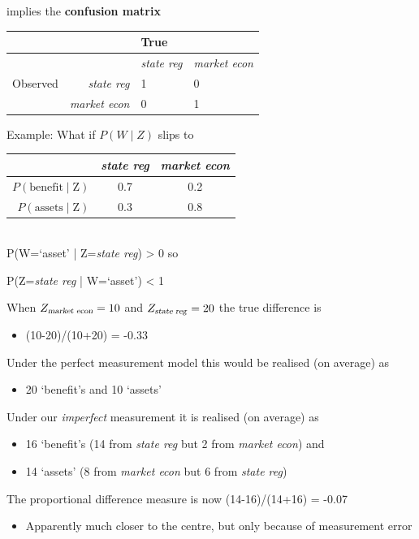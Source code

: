 \documentclass[11pt,compress,professionalfonts]{beamer}
\newcommand{\ita}{\begin{itemize}}
\newcommand{\itm}{\item[]}
\newcommand{\itz}{\end{itemize}}
\begin{document}
implies the \textbf{confusion matrix} 

\begin{center}
\begin{tabular}{lrll} \toprule
        & & True & \\\midrule
        & & \textsl{state reg} & \textsl{market econ} \\ \midrule
Observed & \textsl{state reg}  & 1      & 0 \\ 
     & \textsl{market econ}  & 0      & 1 \\ \bottomrule
\end{tabular}
\end{center}





Example: What if $P(W \mid Z)$ slips to
\begin{center}
\begin{tabular}{rcc} \toprule
 & \textsl{state reg} & \textsl{market econ} \\ \midrule
$P(\text{benefit} \mid \text{Z})$ & 0.7 & 0.2 \\
$P(\text{assets} \mid  \text{Z})$ & 0.3 & 0.8 \\ \bottomrule
\end{tabular}
\end{center}

~\\
P(W=`asset' | Z=\textsl{state reg}) > 0 so

P(Z=\textsl{state reg} | W=`asset') < 1


When $Z_{\text{\textsl{market econ}}}=10$ and $Z_{\text{\textsl{state reg}}}=20$ the true difference is 
\ita
\itm (10-20)/(10+20) = -0.33
\itz
Under the perfect measurement model this would be realised (on average) as 
\ita
\itm 20 `benefit's and 10 `assets'
\itz


Under our \textit{imperfect} measurement it is realised (on average) as 
\ita
\itm 16 `benefit's (14 from \textsl{state reg} but 2 from \textsl{market econ}) and
\itm 14 `assets' (8 from \textsl{market econ} but 6 from \textsl{state reg})
\itz


The proportional difference measure is now (14-16)/(14+16) = -0.07
\ita
\itm Apparently much closer to the centre, but only because of measurement error
\itz
\end{document}
